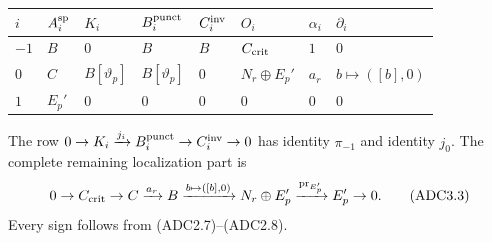 {\def\LTcaptype{none} %
\begin{longtable}[]{@{}
  >{\raggedright\arraybackslash}p{}
  >{\raggedright\arraybackslash}p{}
  >{\raggedright\arraybackslash}p{}
  >{\raggedright\arraybackslash}p{}
  >{\raggedright\arraybackslash}p{}
  >{\raggedright\arraybackslash}p{}
  >{\raggedright\arraybackslash}p{}
  >{\raggedright\arraybackslash}p{}@{}}
\toprule\noalign{}
\begin{minipage}[b]{\linewidth}\raggedright
\(i\)
\end{minipage} & \begin{minipage}[b]{\linewidth}\raggedright
\(A_i^{\rm sp}\)
\end{minipage} & \begin{minipage}[b]{\linewidth}\raggedright
\(K_i\)
\end{minipage} & \begin{minipage}[b]{\linewidth}\raggedright
\(B_i^{\rm punct}\)
\end{minipage} & \begin{minipage}[b]{\linewidth}\raggedright
\(C_i^{\rm inv}\)
\end{minipage} & \begin{minipage}[b]{\linewidth}\raggedright
\(O_i\)
\end{minipage} & \begin{minipage}[b]{\linewidth}\raggedright
\(\alpha_i\)
\end{minipage} & \begin{minipage}[b]{\linewidth}\raggedright
\(\partial_i\)
\end{minipage} \\
\midrule\noalign{}
\endhead
\bottomrule\noalign{}
\endlastfoot
\(-1\) & \(B\) & \(0\) & \(B\) & \(B\) & \(C_{\rm crit}\) & \(1\) &
\(0\) \\
\(0\) & \(C\) & \(B[\vartheta_p]\) & \(B[\vartheta_p]\) & \(0\) &
\(N_r\oplus E_p'\) & \(a_r\) & \(b\mapsto([b],0)\) \\
\(1\) & \(E_p'\) & \(0\) & \(0\) & \(0\) & \(0\) & \(0\) & \(0\) \\
\end{longtable}
}

The row
\(0\to K_i\xrightarrow{j_i}B_i^{\rm punct}\to C_i^{\rm inv}\to0\) has
identity \(\pi_{-1}\) and identity \(j_0\). The complete remaining
localization part is \[
0\to C_{\rm crit}\to C\xrightarrow{a_r}B
\xrightarrow{b\mapsto([b],0)}N_r\oplus E_p'
\xrightarrow{\mathrm{pr}_{E_p'}}E_p'\to0.
\tag{ADC3.3}
\] Every sign follows from (ADC2.7)--(ADC2.8).

